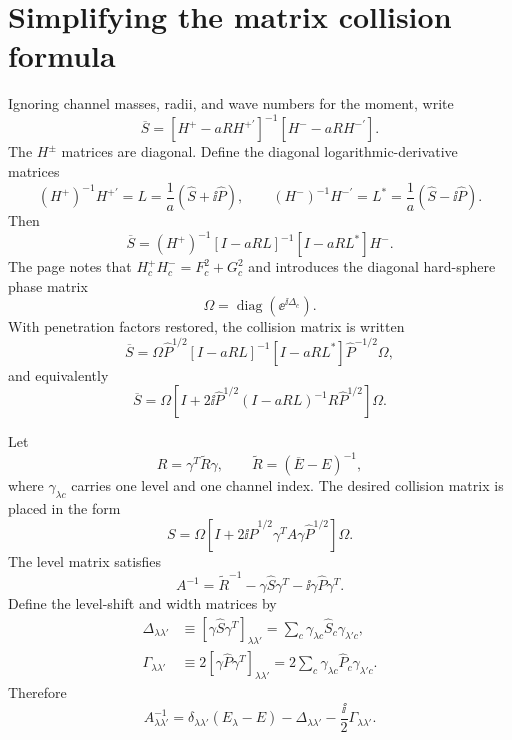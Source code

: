 \section{Simplifying the matrix collision formula}
Ignoring channel masses, radii, and wave numbers for the moment, write
\[
  \overline S=
  [H^+-aRH^{+\prime}]^{-1}
  [H^--aRH^{-\prime}].
\]
The $H^\pm$ matrices are diagonal.  Define the diagonal logarithmic-derivative matrices
\begin{equation}
  (H^+)^{-1}H^{+\prime}=L
  =\frac1a(\widehat S+\ii\widehat P),
  \qquad
  (H^-)^{-1}H^{-\prime}=L^*
  =\frac1a(\widehat S-\ii\widehat P).
  \label{eq:rmat-L-matrices}
\end{equation}
Then
\begin{equation}
  \overline S=(H^+)^{-1}
  [I-aRL]^{-1}[I-aRL^*]H^-.
  \label{eq:rmat-S-L}
\end{equation}
The page notes that $H_c^+H_c^-=F_c^2+G_c^2$ and introduces the diagonal hard-sphere phase matrix
\[
  \Omega=\operatorname{diag}\!\left(\ee^{\ii\Delta_c}\right).
\]
With penetration factors restored, the collision matrix is written
\begin{equation}
  \overline S=
  \Omega\widehat P^{1/2}
  [I-aRL]^{-1}[I-aRL^*]
  \widehat P^{-1/2}\Omega,
  \label{eq:rmat-S-penetration-1}
\end{equation}
and equivalently
\begin{equation}
  \boxed{
  \overline S=
  \Omega\left[
    I+2\ii\widehat P^{1/2}
    (I-aRL)^{-1}R
    \widehat P^{1/2}
  \right]\Omega.}
  \label{eq:rmat-S-penetration-2}
\end{equation}

Let
\[
  R=\gamma^T\widetilde R\gamma,
  \qquad
  \widetilde R=(\overline E-E)^{-1},
\]
where $\gamma_{\lambda c}$ carries one level and one channel index.  The desired collision matrix is placed in the form
\begin{equation}
  S=\Omega\left[
    I+2\ii\widehat P^{1/2}
    \gamma^T A\gamma
    \widehat P^{1/2}
  \right]\Omega.
  \label{eq:rmat-S-level-matrix}
\end{equation}
The level matrix satisfies
\begin{equation}
  \boxed{
  A^{-1}=\widetilde R^{-1}
  -\gamma\widehat S\gamma^T
  -\ii\gamma\widehat P\gamma^T.}
  \label{eq:rmat-A-inverse}
\end{equation}
Define the level-shift and width matrices by
\begin{align}
  \Delta_{\lambda\lambda'}
  &\equiv
  [\gamma\widehat S\gamma^T]_{\lambda\lambda'}
  =\sum_c\gamma_{\lambda c}\widehat S_c\gamma_{\lambda'c},
  \label{eq:rmat-level-shift}\\
  \Gamma_{\lambda\lambda'}
  &\equiv
  2[\gamma\widehat P\gamma^T]_{\lambda\lambda'}
  =2\sum_c\gamma_{\lambda c}\widehat P_c\gamma_{\lambda'c}.
  \label{eq:rmat-width-matrix}
\end{align}
Therefore
\begin{equation}
  \boxed{
  A^{-1}_{\lambda\lambda'}
  =\delta_{\lambda\lambda'}(E_\lambda-E)
  -\Delta_{\lambda\lambda'}
  -\frac{\ii}{2}\Gamma_{\lambda\lambda'}.}
  \label{eq:rmat-level-matrix-elements}
\end{equation}

